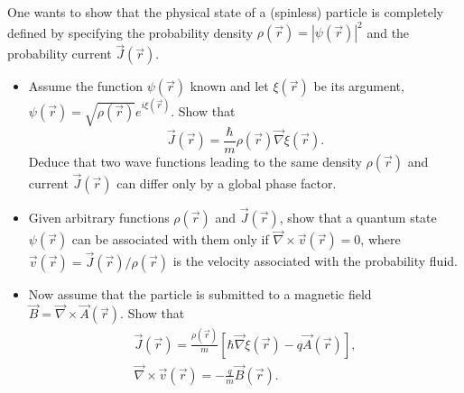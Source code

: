 \documentclass[12pt,a4paper]{article}
\newenvironment{problem}[2][Problem]{\begin{trivlist}
\item[\hskip \labelsep {\bfseries #1}\hskip \labelsep {\bfseries #2.}]}{\end{trivlist}}
\begin{document}
\begin{problem}{3}
 [C-T Exercise 3-9] One wants to show that the physical state of a (spinless) particle is completely defined by specifying the probability density $\rho(\vec{r})=|\psi(\vec{r})|^2$ and the probability current $\vec{J}(\vec{r})$.
 \begin{itemize}
 \item[(a)] Assume the function $\psi(\vec{r})$ known and let $\xi(\vec{r})$ be its argument, $\psi(\vec{r})=\sqrt{\rho(\vec{r})}e^{i\xi(\vec{r})}$. Show that
 \[
 \vec{J}(\vec{r})=\frac{\hbar}{m}\rho(\vec{r})\vec{\nabla}\xi(\vec{r}).
 \]
 Deduce that two wave functions leading to the same density $\rho(\vec{r})$ and current $\vec{J}(\vec{r})$ can differ only by a global phase factor.
\item[(b)] Given arbitrary functions $\rho(\vec{r})$ and $\vec{J}(\vec{r})$, show that a quantum state $\psi(\vec{r})$ can be associated with them only if $\vec{\nabla}\times\vec{v}(\vec{r})=0$, where $\vec{v}(\vec{r})=\vec{J}(\vec{r})/\rho(\vec{r})$ is the velocity associated with the probability fluid.
\item[(c)] Now assume that the particle is submitted to a magnetic field $\vec{B}=\vec{\nabla}\times\vec{A}(\vec{r})$. Show that
\begin{gather*}
\vec{J}(\vec{r})=\frac{\rho(\vec{r})}{m}[\hbar\vec{\nabla}\xi(\vec{r})-q\vec{A}(\vec{r})],\\
\vec{\nabla}\times\vec{v}(\vec{r})=-\frac{q}{m}\vec{B}(\vec{r}).
\end{gather*}
\end{itemize}
\end{problem}
\end{document}
